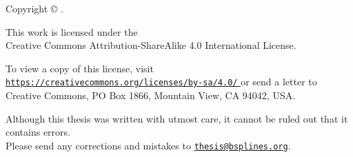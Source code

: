 {  Copyright \copyright{} \theyear{} \theauthor{}.
  
  \vspace{1em}
  
  \hangindent=29mm%
  This work is licensed under the\\
  Creative Commons Attribution-ShareAlike 4.0 International License.
  
  To view a copy of this license, visit
  \href{%
    https://creativecommons.org/licenses/by-sa/4.0/%
  }{
    \texttt{https://creativecommons.org/licenses/by-sa/4.0/}%
  }
  or send a letter to
  Creative Commons, PO Box 1866, Mountain View, CA 94042, USA.
  
  \vspace{1em}
  
  Although this thesis was written with utmost care,
  it cannot be ruled out that it contains errors.\\
  Please send any corrections and mistakes to
  \href{mailto:thesis@bsplines.org}{\texttt{thesis@bsplines.org}}.
}

\cleardoublepage
